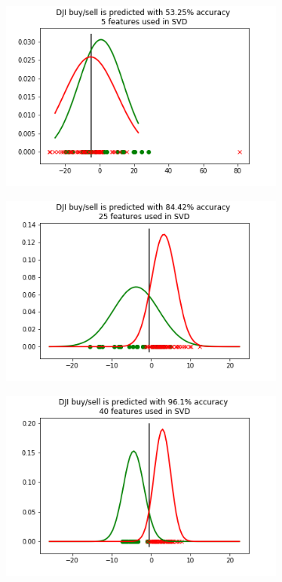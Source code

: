 \documentclass{article}
\begin{document}
\begin{figure}
\centering
\begin{subfigure}{.5\textwidth}
    \centering
    \includegraphics[width=1.0\linewidth]{Figures/LDA_Accuracy_DJI_5.png}
    \caption{ }
    \label{fig:cropVar}
\end{subfigure}%
\begin{subfigure}{.5\textwidth}
    \centering
    \includegraphics[width=1.0\linewidth]{Figures/LDA_Accuracy_DJI_25.png}
    \caption{ }
    \label{fig:uncropVar}
\end{subfigure}
\begin{subfigure}{.5\textwidth}
    \centering
    \includegraphics[width=1.0\linewidth]{Figures/LDA_Accuracy_DJI_40.png}

\end{subfigure}
\end{figure}
\end{document}

